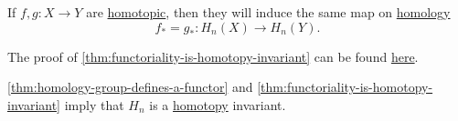 \begin{theorem}\label{thm:functoriality-is-homotopy-invariant}
	If \(f, g\colon X \to Y\) are \hyperref[def:homotopic]{homotopic}, then they will induce the same map on \hyperref[def:homology-group]{homology}
	\[
		f_\ast = g_\ast \colon H_n(X) \to H_n(Y).
	\]
\end{theorem}
The proof of \autoref{thm:functoriality-is-homotopy-invariant} can be found \hyperref[pf:functoriality-is-homotopy-invariant]{here}.

\begin{exercise}
	\autoref{thm:homology-group-defines-a-functor} and \autoref{thm:functoriality-is-homotopy-invariant} imply that \(H_{n} \) is a \hyperref[def:homotopy]{homotopy} invariant.
\end{exercise}